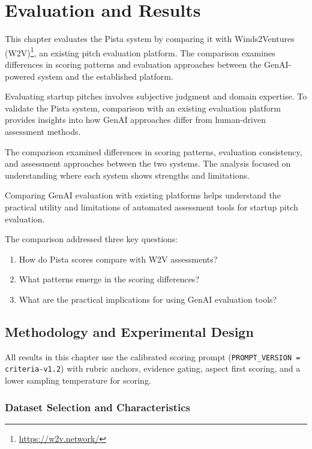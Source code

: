 \chapter{Evaluation and Results}
\label{ch:evaluation}

This chapter evaluates the Pista system by comparing it with Winds2Ventures (W2V)\footnote{\url{https://w2v.network/}}, an existing pitch evaluation platform. The comparison examines differences in scoring patterns and evaluation approaches between the GenAI-powered system and the established platform.

Evaluating startup pitches involves subjective judgment and domain expertise. To validate the Pista system, comparison with an existing evaluation platform provides insights into how GenAI approaches differ from human-driven assessment methods.

The comparison examined differences in scoring patterns, evaluation consistency, and assessment approaches between the two systems. The analysis focused on understanding where each system shows strengths and limitations.

Comparing GenAI evaluation with existing platforms helps understand the practical utility and limitations of automated assessment tools for startup pitch evaluation.

The comparison addressed three key questions:
\begin{enumerate}
    \item How do Pista scores compare with W2V assessments?
    \item What patterns emerge in the scoring differences?
    \item What are the practical implications for using GenAI evaluation tools?
\end{enumerate}

\section{Methodology and Experimental Design}
\label{sec:methodology}

All results in this chapter use the calibrated scoring prompt (\texttt{PROMPT\_VERSION = criteria\textrm{-}v1.2}) with rubric anchors, evidence gating, aspect first scoring, and a lower sampling temperature for scoring.

\subsection{Dataset Selection and Characteristics}
\label{subsec:dataset}

